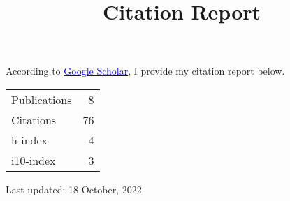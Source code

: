 \documentclass[a4paper,10pt]{article}
\title{Citation Report}
\date{}
\newcommand{\blue}[1]{\textcolor{blue}{#1}}
\begin{document}
	\maketitle
	According to \href{https://scholar.google.com/citations?pli=1&authuser=1&user=xO4PpdAAAAAJ}{\blue{Google Scholar}}, I provide my citation report below.
	
	\begin{table}[h]
		\begin{center}
			\begin{tabular}{lr}
				\toprule
				Publications & 8 \\
				Citations & 76 \\
				h-index & 4 \\
				i10-index & 3 \\
				\bottomrule
			\end{tabular}
		\end{center}

	\end{table}
	
	Last updated: 18 October, 2022
	
\end{document}

